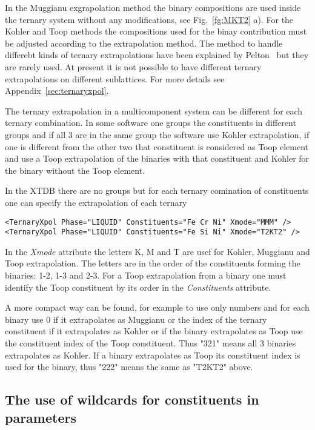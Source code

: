 \documentclass{article}
\begin{document}
\begin{appendices}
In the Muggianu exgrapolation method the binary compositions are used
inside the ternary system without any modifications, see
Fig.~\ref{fg:MKT2} a).  For the Kohler and Toop methods the
compositions used for the binay contribution must be adjusted
according to the extrapolation method.  The method to handle differebt
kinds of ternary extrapolations have been explained by
Pelton~\cite{01Pel} but they are rarely used.  At present it is not
possible to have different ternary extrapolations on different
sublattices.  For more details see Appendix~\ref{sec:ternaryxpol}.

The ternary extrapolation in a multicomponent system can be different
for each ternary combination.  In some software one groups the
constituents in different groups and if all 3 are in the same group
the software use Kohler extrapolation, if one is different from the
other two that constituent is considered as Toop element and use a
Toop extrapolation of the binaries with that constituent and Kohler
for the binary without the Toop element.

In the XTDB there are no groups but for each ternary comination of
constituents one can specify the extrapolation of each ternary

\begin{verbatim}
<TernaryXpol Phase="LIQUID" Constituents="Fe Cr Ni" Xmode="MMM" />
<TernaryXpol Phase="LIQUID" Constituents="Fe Si Ni" Xmode="T2KT2" />
\end{verbatim}

In the {\em Xmode} attribute the letters K, M and T are usef for
Kohler, Muggianu and Toop extrapolation.  The letters are in the order
of the constituents forming the binaries: 1-2, 1-3 and 2-3.  For a
Toop extrapolation from a binary one must identify the Toop
constituent by its order in the {\em Constituents} attribute.

A more compact way can be found, for example to use only numbers and
for each binary use 0 if it extrapolates as Muggianu or the index of
the ternary constituent if it extrapolates as Kohler or if the binary
extrapolates as Toop use the constituent index of the Toop
constituent.  Thus "321" means all 3 binaries extrapolates as Kohler.
If a binary extrapolates as Toop its constituent index is used for the
binary, thus "222" means the same as "T2KT2" above.

\subsection{The use of wildcards for constituents in parameters}\label{sec:wildcard}


\end{appendices}
\end{document}
